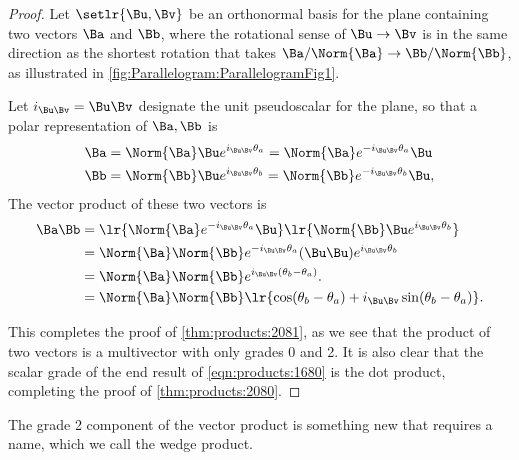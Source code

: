 \begin{proof}
Let \( \setlr{\Bu, \Bv} \) be an orthonormal basis for the plane containing
two vectors \( \Ba \) and \( \Bb \), where the rotational sense of \( \Bu \rightarrow \Bv \) is in the same direction as the shortest rotation that takes \( \Ba/\Norm{\Ba} \rightarrow \Bb/\Norm{\Bb} \), as
illustrated in
\cref{fig:Parallelogram:ParallelogramFig1}.

Let \( i_{\Bu \Bv} = \Bu \Bv \) designate the unit pseudoscalar for the plane, so that
a polar representation of \( \Ba, \Bb \) is
\begin{equation}\label{eqn:products:1660}
\begin{aligned}
\Ba &= \Norm{\Ba} \Bu e^{ i_{\Bu \Bv} \theta_a } = \Norm{\Ba} e^{ -i_{\Bu \Bv} \theta_a } \Bu \\
\Bb &= \Norm{\Bb} \Bu e^{ i_{\Bu \Bv} \theta_b } = \Norm{\Bb} e^{ -i_{\Bu \Bv} \theta_b } \Bu,
\end{aligned}
\end{equation}
The vector product of these two vectors is
\begin{equation}\label{eqn:products:1680}
\begin{aligned}
\Ba \Bb
&= \lr{ \Norm{\Ba} e^{ -i_{\Bu \Bv} \theta_a } \Bu } \lr{ \Norm{\Bb} \Bu e^{ i_{\Bu \Bv} \theta_b } } \\
&= \Norm{\Ba} \Norm{\Bb} e^{ -i_{\Bu \Bv} \theta_a } ( \Bu \Bu ) e^{ i_{\Bu \Bv} \theta_b } \\
&= \Norm{\Ba} \Norm{\Bb} e^{ i_{\Bu \Bv} (\theta_b - \theta_a)}. \\
&= \Norm{\Ba} \Norm{\Bb} \lr{ \cos (\theta_b - \theta_a) + i_{\Bu \Bv} \sin (\theta_b - \theta_a) }.
\end{aligned}
\end{equation}

This completes the proof of \cref{thm:products:2081}, as we see that the
product of two vectors is a multivector with only grades 0 and 2.
It is also clear that
the scalar grade of the end result of \cref{eqn:products:1680} is the 
dot product, completing the proof of \cref{thm:products:2080}.
\end{proof}

The grade 2 component of the vector product is something new that requires a name, which we call the wedge product.
\index{\(\Ba \wedge \Bb\)}

